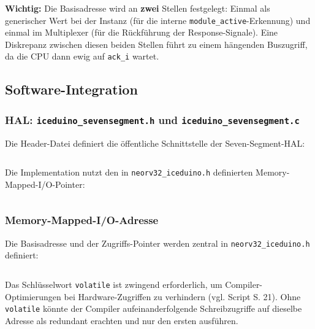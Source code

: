 \inputminted[linenos,frame=single,fontsize=\footnotesize,firstline=231,lastline=234]{vhdl}{A6_Abgabe/iceduino_setup/osflow/boards/iceduino/neorv32_iceduino_top.vhd}

\textbf{Wichtig:} Die Basisadresse wird an \textbf{zwei} Stellen festgelegt: Einmal als generischer Wert bei der Instanz (für die interne \texttt{module\_active}-Erkennung) und einmal im Multiplexer (für die Rückführung der Response-Signale). Eine Diskrepanz zwischen diesen beiden Stellen führt zu einem hängenden Buszugriff, da die CPU dann ewig auf \texttt{ack\_i} wartet.


\subsection{Software-Integration}

\subsubsection{HAL: \texttt{iceduino\_sevensegment.h} und \texttt{iceduino\_sevensegment.c}}

Die Header-Datei definiert die öffentliche Schnittstelle der Seven-Segment-HAL:

\inputminted[linenos,frame=single,fontsize=\footnotesize]{c}{A6_Abgabe/iceduino_setup/sw/lib/include/iceduino_sevensegment.h}

Die Implementation nutzt den in \texttt{neorv32\_iceduino.h} definierten Memory-Mapped-I/O-Pointer:

\inputminted[linenos,frame=single,fontsize=\footnotesize]{c}{A6_Abgabe/iceduino_setup/sw/lib/source/iceduino_sevensegment.c}


\newpage
\subsubsection{Memory-Mapped-I/O-Adresse}


Die Basisadresse und der Zugriffs-Pointer werden zentral in \texttt{neorv32\_iceduino.h} definiert:

\inputminted[linenos,frame=single,fontsize=\footnotesize,firstline=45,lastline=50]{c}{A6_Abgabe/iceduino_setup/sw/lib/include/neorv32_iceduino.h}
Das Schlüsselwort \texttt{volatile} ist zwingend erforderlich, um Compiler-Optimierungen bei Hardware-Zugriffen zu verhindern (vgl. Script S. 21). Ohne \texttt{volatile} könnte der Compiler aufeinanderfolgende Schreibzugriffe auf dieselbe Adresse als redundant erachten und nur den ersten ausführen.
